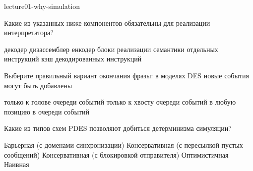 \documentclass[a4paper, addpoints, answers]{exam}
\begin{document}
\begin{questions}

lecture01-why-simulation


\question[1] Какие из указанных ниже компонентов обязательны для реализации интерпретатора?
\begin{choices}
    \correctchoice декодер
    \choice дизассемблер
    \choice енкодер
    \correctchoice блоки реализации семантики отдельных инструкций
    \choice кэш декодированных инструкций
\end{choices}

\question[1] Выберите правильный вариант окончания фразы: в моделях DES новые события могут быть добавлены
\begin{choices}
    \choice только к голове очереди событий
    \choice только к хвосту очереди событий
    \correctchoice в любую позицию в очереди событий
\end{choices}


\question[1] Какие из типов схем PDES позволяют добиться детерминизма симуляции?
\begin{choices}
    \correctchoice Барьерная (с доменами синхронизации)
    \choice Консервативная (с пересылкой пустых сообщений)
    \choice Консервативная (с блокировкой отправителя)
    \choice Оптимистичная
    \choice Наивная
\end{choices}




\end{questions}
\end{document}
